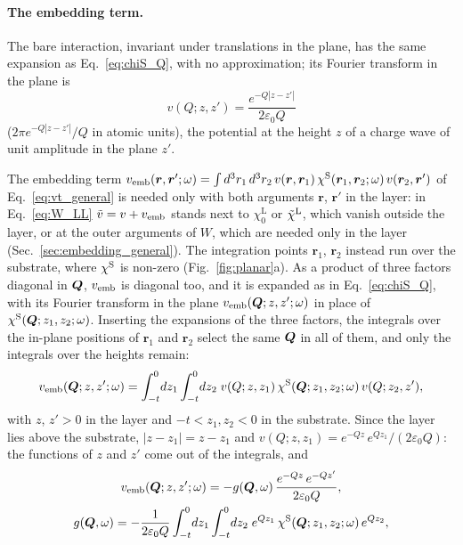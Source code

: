 \documentclass[10pt,a4paper]{paper}
\begin{document}
\paragraph{The embedding term.} The bare interaction, invariant under translations in the plane, has the same
expansion as Eq.~\eqref{eq:chiS_Q}, with no approximation; its Fourier transform in the plane is
\begin{equation}
v(Q;z,z') = \frac{e^{-Q|z - z'|}}{2\varepsilon_0 Q}
\label{eq:v_Qz}
\end{equation}
($2\pi e^{-Q|z - z'|}/Q$ in atomic units), the potential at the height $z$ of a charge wave of unit amplitude in the
plane $z'$.

The embedding term $v_{\mathrm{emb}}(\bm{r},\bm{r}';\omega) = \int d^3r_1\,d^3r_2\,v(\bm{r},\bm{r}_1)\,
\chi^{\mathrm{S}}(\bm{r}_1,\bm{r}_2;\omega)\,v(\bm{r}_2,\bm{r}')$ of Eq.~\eqref{eq:vt_general} is needed only with both arguments
$\bm{r}$, $\bm{r}'$ in the layer: in Eq.~\eqref{eq:W_LL} $\tilde{v} = v + v_{\mathrm{emb}}$ stands next to $\chi_0^{\mathrm{L}}$ or
$\tilde{\chi}^{\mathrm{L}}$, which vanish outside the layer, or at the outer arguments of $W$, which are needed only in the layer
(Sec.~\ref{sec:embedding_general}). The integration points $\bm{r}_1$, $\bm{r}_2$ instead run over the substrate, where
$\chi^{\mathrm{S}}$ is non-zero (Fig.~\ref{fig:planar}a). As a product of three factors diagonal in $\bm{Q}$, $v_{\mathrm{emb}}$ is diagonal
too, and it is expanded as in Eq.~\eqref{eq:chiS_Q}, with its Fourier transform in the plane
$v_{\mathrm{emb}}(\bm{Q};z,z';\omega)$ in place of $\chi^{\mathrm{S}}(\bm{Q};z_1,z_2;\omega)$. Inserting the expansions of the three factors, the
integrals over the in-plane positions of $\bm{r}_1$ and $\bm{r}_2$ select the same $\bm{Q}$ in all of them, and only the
integrals over the heights remain:
\begin{equation}
v_{\mathrm{emb}}(\bm{Q};z,z';\omega) = \int_{-t}^{0}\! dz_1\int_{-t}^{0}\! dz_2\; v(Q;z,z_1)\,\chi^{\mathrm{S}}(\bm{Q};z_1,z_2;\omega)\,v(Q;z_2,z') ,
\label{eq:vemb_chain}
\end{equation}
with $z$, $z' > 0$ in the layer and $-t < z_1, z_2 < 0$ in the substrate. Since the layer lies above the substrate,
$|z - z_1| = z - z_1$ and $v(Q;z,z_1) = e^{-Qz}\,e^{Qz_1}/(2\varepsilon_0 Q)$: the functions of $z$ and $z'$ come out
of the integrals, and
\begin{gather}
v_{\mathrm{emb}}(\bm{Q};z,z';\omega) = -g(\bm{Q},\omega)\,\frac{e^{-Qz}\,e^{-Qz'}}{2\varepsilon_0 Q} ,
\nonumber \\
g(\bm{Q},\omega) = -\frac{1}{2\varepsilon_0 Q}\int_{-t}^{0}\! dz_1\int_{-t}^{0}\! dz_2\;
e^{Qz_1}\,\chi^{\mathrm{S}}(\bm{Q};z_1,z_2;\omega)\,e^{Qz_2} ,
\label{eq:vemb_planar}
\end{gather}
\end{document}
